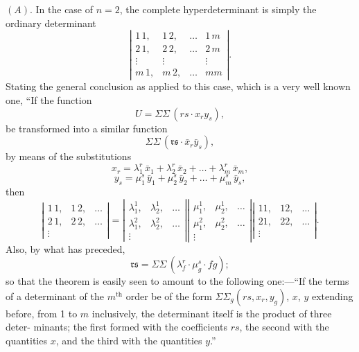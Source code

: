 \documentclass[11pt,a4paper]{article}
\theoremstyle{plain}
\theoremstyle{definition}
\theoremstyle{remark}
\begin{document}
$(A)$. In the case of $n=2$, the complete hyperdeterminant is simply the ordinary
determinant
\[
\left|
\begin{array}{cccc}
1\,1,&1\,2,&\ldots&1\,m \\
2\,1,&2\,2,&\ldots&2\,m \\
\vdots&\vdots&&\vdots \\
m\,1,&m\,2,&\ldots&mm
\end{array}
\right|.
\]
Stating the general conclusion as applied to this case, which is a very well known one,
``If the function
\[
U = \Sigma\Sigma\,(rs\cdot x_ry_s),
\]
be transformed into a similar function
\[
\Sigma\Sigma\,(\mathfrak{rs}\cdot\bar{x}_r\bar{y}_s),
\]
by means of the substitutions
\[
x_r = \lambda_1^r\,\bar{x}_1 + \lambda_2^r\,\bar{x}_2 + \ldots + \lambda_m^r\,\bar{x}_m,
\]
\[
y_s = \mu_1^s\,\bar{y}_1 + \mu_2^s\,\bar{y}_2 + \ldots + \mu_m^s\,\bar{y}_s,
\]
then
\[
\left|
\begin{array}{ccc}
1\,1,&1\,2,&\ldots \\
2\,1,&2\,2,&\ldots \\
\vdots
\end{array}
\right|
=
\left|
\begin{array}{ccc}
\lambda_1^1,&\lambda_2^1,&\ldots \\
\lambda_1^2,&\lambda_2^2,&\ldots \\
\vdots
\end{array}
\right|
\left|
\begin{array}{ccc}
\mu_1^1,&\mu_2^1,&\ldots \\
\mu_1^2,&\mu_2^2,&\ldots \\
\vdots
\end{array}
\right|
\left|
\begin{array}{ccc}
\mathfrak{1}\mathfrak{1},&\mathfrak{1}\mathfrak{2},&\ldots \\
\mathfrak{2}\mathfrak{1},&\mathfrak{2}\mathfrak{2},&\ldots \\
\vdots
\end{array}
\right|.
\]
Also, by what has preceded,
\[
\mathfrak{rs} = \Sigma\Sigma\,(\lambda_f^r\cdot\mu_g^s\cdot fg);
\]
so that the theorem is easily seen to amount to the following one:---``If the terms of
a determinant of the $m^{\text{th}}$ order be of the form $\Sigma\Sigma_g(rs,x_r,y_g)$, $x$, $y$ extending
before, from 1 to $m$ inclusively, the determinant itself is the product of three deter-
minants; the first formed with the coefficients $rs$, the second with the quantities $x$,
and the third with the quantities $y$.''
\end{document}
